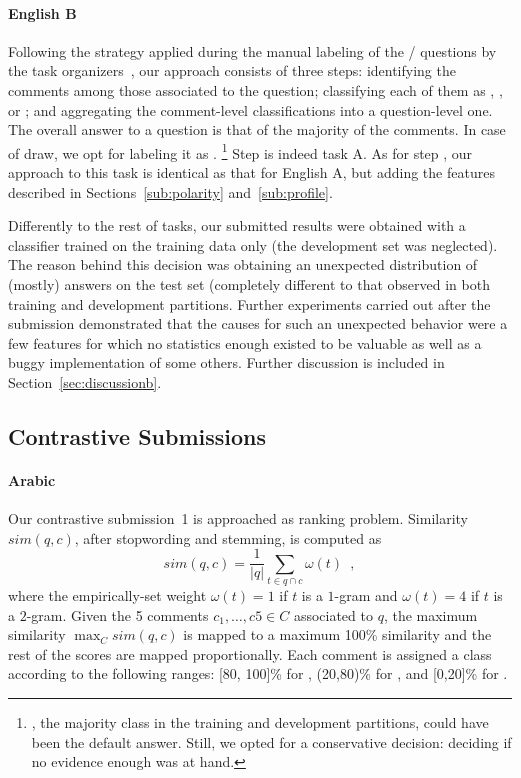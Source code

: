 \paragraph{English B}

Following the strategy applied during the manual labeling of the \yes/\no 
questions by the task organizers~\cite{Marquez-EtAl:2015:SemEval}, our approach 
consists of three steps:
\Ni identifying the \good comments among those associated to the question;
\Nii classifying each of them as \yes, \no, or \unsure; and 
\Niii aggregating the comment-level classifications into a question-level one. 
The overall answer to a question is that of the majority of the comments. In 
case of draw, we opt for labeling it as \unsure.%
\footnote{\yes, the majority class in the training and development partitions, 
could have been the default answer. Still, we opted for a conservative decision: 
deciding \unsure if no evidence enough was at hand.}
Step \Ni is indeed task A. As for step \Nii, our approach to this task is 
identical as that for English A, but adding the features described in 
Sections~\ref{sub:polarity} and~\ref{sub:profile}.

Differently to the rest of tasks, our submitted results were obtained with a 
classifier trained on the training data only (the development set was 
neglected). The reason behind this decision was obtaining an unexpected 
distribution of (mostly) \yes answers on the test set (completely different to 
that observed in both training and development partitions. Further experiments 
carried out after the submission demonstrated that the causes for such an 
unexpected behavior were a few features for which no statistics enough existed 
to be valuable as well as a buggy implementation of some others. Further 
discussion is included in Section~\ref{sec:discussionb}.


\subsection{Contrastive Submissions}
\label{sub:contrastive}

\paragraph{Arabic} 

Our contrastive submission~1 is approached as ranking problem. Similarity 
$sim(q,c)$, after stopwording and stemming, is computed as 
\begin{equation}
 sim(q,c) = \frac{1}{|q|} \sum_{t\in q\cap c} \omega(t) \enspace ,
 \label{eq:overlap}
\end{equation}
% 
where the empirically-set weight $\omega(t)=1$ if $t$ is a $1$-gram and 
$\omega(t)=4$ if $t$ is a $2$-gram. Given the 5 comments 
$c_1,\ldots,c5\in C$ associated to $q$, the maximum similarity $\max_C sim(q,c)$ 
is mapped to a maximum 100\% similarity and the rest of the scores are mapped 
proportionally. Each comment is assigned a class according to the following 
ranges: [80, 100]\% for \dir, (20,80)\% for \rel, and [0,20]\% for \irel.


